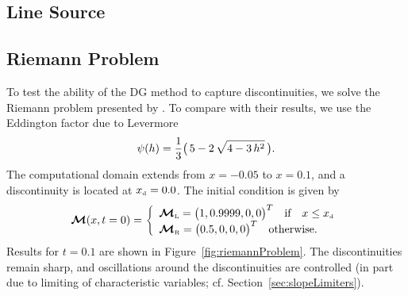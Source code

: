 \documentclass[10pt,preprint]{aastex}
\begin{document}
\subsection{Line Source}

\subsection{Riemann Problem}

To test the ability of the DG method to capture discontinuities, we solve the Riemann problem presented by \citet{OHF2012}.  
To compare with their results, we use the Eddington factor due to Levermore \citep{levermore_1984}
\begin{equation}
  \psi(h)=\frac{1}{3}\big(\,5-2\,\sqrt{4-3\,h^{2}}\,\big).  
  \label{eq:eddingtonFactorLevermore}
\end{equation}
The computational domain extends from $x=-0.05$ to $x=0.1$, and a discontinuity is located at $x_{\mbox{\tiny d}}=0.0$.  
The initial condition is given by
\begin{equation}
  \boldsymbol{\mathcal{M}}(x,t=0)=
  \left\{
  \begin{array}{l}
  \boldsymbol{\mathcal{M}}_{\mbox{\tiny L}}=\big(1,0.9999,0,0\big)^{T} \quad\text{if}\quad x\le x_{\mbox{\tiny d}} \\
  \boldsymbol{\mathcal{M}}_{\mbox{\tiny R}}=\big(0.5,0,0,0\big)^{T} \quad\text{otherwise}.
  \end{array}
  \right.
  \label{eq:riemannProblem}
\end{equation}
Results for $t=0.1$ are shown in Figure~\ref{fig:riemannProblem}.  
The discontinuities remain sharp, and oscillations around the discontinuities are controlled (in part due to limiting of characteristic variables; cf. Section~\ref{sec:slopeLimiters}).  
\end{document}
